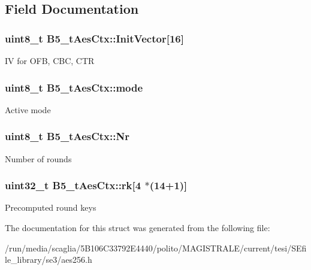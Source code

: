 \subsection{Field Documentation}
\hypertarget{struct_b5__t_aes_ctx_add6ae748bf9387dd58185afc39ee4f4f}{
\subsubsection[{Init\-Vector}]{\setlength{\rightskip}{0pt plus 5cm}uint8\-\_\-t B5\-\_\-t\-Aes\-Ctx\-::\-Init\-Vector\mbox{[}16\mbox{]}}}\label{struct_b5__t_aes_ctx_add6ae748bf9387dd58185afc39ee4f4f}
I\-V for O\-F\-B, C\-B\-C, C\-T\-R \hypertarget{struct_b5__t_aes_ctx_abee6909cfc704092d6fbfa9dea6f0e6d}{
\subsubsection[{mode}]{\setlength{\rightskip}{0pt plus 5cm}uint8\-\_\-t B5\-\_\-t\-Aes\-Ctx\-::mode}}\label{struct_b5__t_aes_ctx_abee6909cfc704092d6fbfa9dea6f0e6d}
Active mode \hypertarget{struct_b5__t_aes_ctx_a303f5a1ec9e11ea7633068db3c05dbe7}{
\subsubsection[{Nr}]{\setlength{\rightskip}{0pt plus 5cm}uint8\-\_\-t B5\-\_\-t\-Aes\-Ctx\-::\-Nr}}\label{struct_b5__t_aes_ctx_a303f5a1ec9e11ea7633068db3c05dbe7}
Number of rounds \hypertarget{struct_b5__t_aes_ctx_a79225f883cd68df87bf30ca2907650c9}{
\subsubsection[{rk}]{\setlength{\rightskip}{0pt plus 5cm}uint32\-\_\-t B5\-\_\-t\-Aes\-Ctx\-::rk\mbox{[}4 $\ast$(14+1)\mbox{]}}}\label{struct_b5__t_aes_ctx_a79225f883cd68df87bf30ca2907650c9}
Precomputed round keys 

The documentation for this struct was generated from the following file\-:\begin{DoxyCompactItemize}
\item 
/run/media/scaglia/5\-B106\-C33792\-E4440/polito/\-M\-A\-G\-I\-S\-T\-R\-A\-L\-E/current/tesi/\-S\-Efile\-\_\-library/se3/aes256.\-h\end{DoxyCompactItemize}
